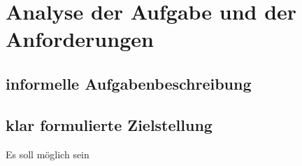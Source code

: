 \section{Analyse der Aufgabe und der Anforderungen}
	\subsection{informelle Aufgabenbeschreibung}
	\subsection{klar formulierte Zielstellung}
	Es soll möglich sein